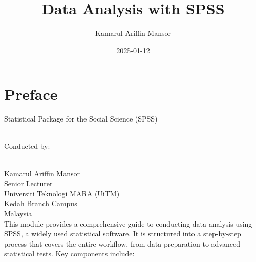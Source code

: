 \documentclass[
  letterpaper,
  DIV=11,
  numbers=noendperiod]{scrreprt}
\title{Data Analysis with SPSS}
\author{Kamarul Ariffin Mansor}
\date{2025-01-12}
\renewcommand*\contentsname{Table of contents}
\newcommand\contentsname{Table of contents}
\begin{document}
\maketitle

\renewcommand*\contentsname{Table of contents}
{
\hypersetup{linkcolor=}
\setcounter{tocdepth}{2}
\tableofcontents
}

\chapter*{Preface}\label{preface}


Statistical Package for the Social Science (SPSS)\\
\strut \\
Conducted by:\\
\strut \\
Kamarul Ariffin Mansor\\
Senior Lecturer\\
Universiti Teknologi MARA (UiTM)\\
Kedah Branch Campus\\
Malaysia\\

This module provides a comprehensive guide to conducting data analysis
using SPSS, a widely used statistical software. It is structured into a
step-by-step process that covers the entire workflow, from data
preparation to advanced statistical tests. Key components include:\\
\end{document}
